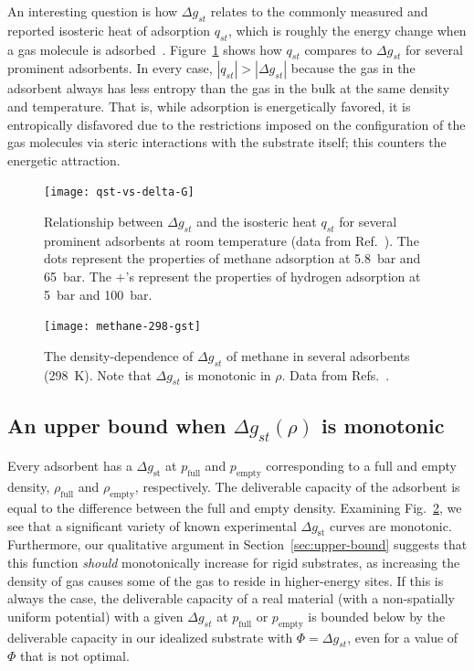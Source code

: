 \documentclass[twoside,twocolumn,9pt]{article}
\newcommand\V{\Phi}
\newcommand\pfull{\ensuremath{p_{\text{full}}}}
\newcommand\pempty{\ensuremath{p_{\text{empty}}}}
\newcommand\rhofull{\ensuremath{\rho_{\text{full}}}}
\newcommand\rhoempty{\ensuremath{\rho_{\text{empty}}}}
\newcommand\gst{\ensuremath{\Delta g_{st}}}
\begin{document}
An interesting question is how $\gst$ relates to the commonly measured and
reported isosteric heat of adsorption $q_{st}$, which is roughly the energy
change when a gas molecule is adsorbed~\cite{sircar1999isosteric,
tian2017differential}. Figure~\ref{fig:qst-vs-delta-G} shows how $q_{st}$
compares to $\gst$ for several prominent adsorbents. In every case,
$|q_{st}|>|\gst|$ because the gas in the adsorbent always has less entropy than
the gas in the bulk at the same density and temperature. That is, while
adsorption is energetically favored, it is entropically disfavored due to the
restrictions imposed on the configuration of the gas molecules via steric
interactions with the substrate itself; this counters the energetic attraction.

\begin{figure}
    \centering
    \texttt{[image: qst-vs-delta-G]}
    \caption{Relationship between $\gst$ and the isosteric heat
      $q_{st}$ for several prominent adsorbents at room
      temperature (data from Ref.~\cite{mason2014evaluating, garcia2018benchmark}). The dots represent the properties of methane
      adsorption at 5.8~bar and 65~bar. The $+$'s represent the
      properties of hydrogen adsorption at 5~bar and
      100~bar.}
    \label{fig:qst-vs-delta-G}
\end{figure}

\begin{figure}
    \centering
    \texttt{[image: methane-298-gst]}
    \caption{The density-dependence of $\gst$ of methane in several
      adsorbents (298\ K). Note that $\gst$ is monotonic in
      $\rho$. Data from
      Refs.~\cite{mason2014evaluating, furukawa2009storage}.
    }
    \label{fig:methane-gst}
\end{figure}

\subsection{An upper bound when $\gst(\rho)$ is monotonic}\label{sec:monotonic}
Every adsorbent has a $\Delta g_\text{st}$ at $\pfull$ and $\pempty$ corresponding
to a full and empty density, $\rhofull$ and $\rhoempty$, respectively. The deliverable capacity of the adsorbent is equal to
the difference between the full and empty density. Examining
Fig.~\ref{fig:methane-gst}, we see that a significant variety of known
experimental $\Delta g_\text{st}$ curves are monotonic. Furthermore, our
qualitative argument in Section~\ref{sec:upper-bound} suggests that this
function \emph{should} monotonically increase for rigid substrates, as
increasing the density of gas causes some of the gas to reside in higher-energy
sites. If this is always the case, the deliverable capacity of a real material
(with a non-spatially uniform potential) with a given $\gst$ at $\pfull$ or
$\pempty$ is bounded below by the deliverable capacity in our idealized
substrate with $\V=\gst$, even for a value of $\V$ that is not optimal.
\end{document}
